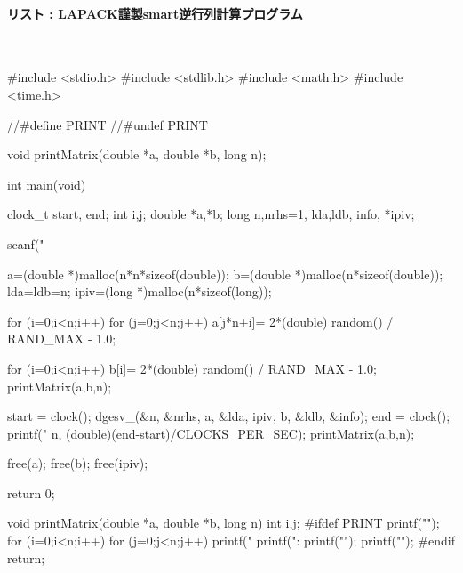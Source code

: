 \paragraph{リスト : LAPACK謹製smart逆行列計算プログラム}　
\begin{MapleInput}
#include <stdio.h>
#include <stdlib.h>
#include <math.h>
#include <time.h>

//#define PRINT
//#undef PRINT

void printMatrix(double *a, double *b, long n);

int main(void){
  clock_t start, end;
  int i,j;
  double *a,*b;
  long n,nrhs=1, lda,ldb, info, *ipiv;

  scanf("%

  a=(double *)malloc(n*n*sizeof(double));
  b=(double *)malloc(n*sizeof(double));
  lda=ldb=n;
  ipiv=(long *)malloc(n*sizeof(long));
  
  for (i=0;i<n;i++){
    for (j=0;j<n;j++){
      a[j*n+i]= 2*(double) random() / RAND_MAX - 1.0;
    }
  }

  for (i=0;i<n;i++){
    b[i]= 2*(double) random() / RAND_MAX - 1.0;
  }
  printMatrix(a,b,n);

  start = clock();
  dgesv_(&n, &nrhs, a, &lda, ipiv, b, &ldb, &info);
  end = clock();
  printf("%
	 n, (double)(end-start)/CLOCKS_PER_SEC);
  printMatrix(a,b,n);

  free(a);
  free(b);
  free(ipiv);

  return 0;
}

void printMatrix(double *a, double *b, long n){
  int i,j;
#ifdef PRINT
  printf("\n");
  for (i=0;i<n;i++){
    for (j=0;j<n;j++){
      printf("%
    }
    printf(":%
    printf("\n");
  }
  printf("\n");
#endif
  return;
}
\end{MapleInput}



